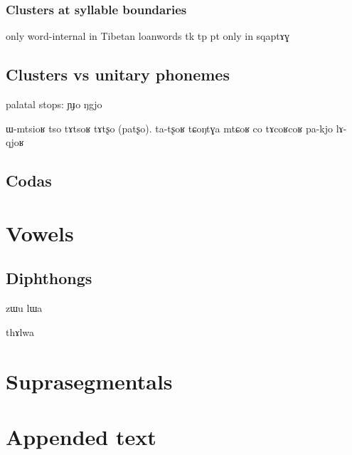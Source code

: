 \documentclass[oldfontcommands,oneside,a4paper,11pt]{article}
\newcommand{\ipa}[1]{{\phon #1}} %
\begin{document}
 
 
 \subsubsection{Clusters at syllable boundaries}
 only word-internal in Tibetan loanwords tk tp 
 pt only in \ipa{sqaptɤɣ}
 
 
      \subsection{Clusters vs unitary phonemes} \label{sec:non.clusters}
      
      
palatal stops:      
      \ipa{ɲɟo} \ipa{ŋgjo}
      
      ɯ-mtsioʁ
	tso tɤtsoʁ 
	tɤtʂo (patʂo). ta-tʂoʁ
 tɕoŋtɣa mtɕoʁ
 co tɤcoʁcoʁ
 pa-kjo
     lɤ-qjoʁ
      \subsection{Codas} \label{sec:coda}
    
    
     \section{Vowels} \label{sec:vowels}
     
          \subsection{Diphthongs}
     zɯu
     lɯa
     
     thɤlwa
     
     \section{Suprasegmentals}
     
         
     \section{Appended text}


\end{document}
